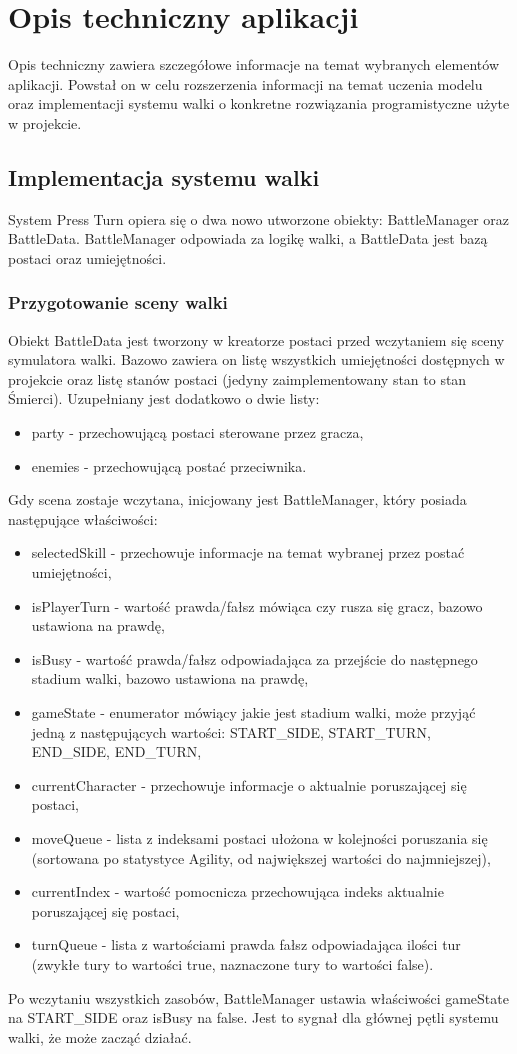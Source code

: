 \documentclass{SGGW-thesis}
\begin{document}
\chapter{Opis techniczny aplikacji}
Opis techniczny zawiera szczegółowe informacje na temat wybranych elementów aplikacji. Powstał on w celu rozszerzenia informacji na temat uczenia modelu oraz implementacji systemu walki o konkretne rozwiązania programistyczne użyte w projekcie.
\section{Implementacja systemu walki}
System Press Turn opiera się o dwa nowo utworzone obiekty: BattleManager oraz BattleData. BattleManager odpowiada za logikę walki, a BattleData jest bazą postaci oraz umiejętności.
\subsection{Przygotowanie sceny walki}
Obiekt BattleData jest tworzony w kreatorze postaci przed wczytaniem się sceny symulatora walki. Bazowo zawiera on listę wszystkich umiejętności dostępnych w projekcie oraz listę stanów postaci (jedyny zaimplementowany stan to stan Śmierci). 
Uzupełniany jest dodatkowo o dwie listy:
\begin{itemize}
  \item party - przechowującą postaci sterowane przez gracza,
  \item enemies - przechowującą postać przeciwnika.
\end{itemize}
Gdy scena zostaje wczytana, inicjowany jest BattleManager, który posiada następujące właściwości:
\begin{itemize}
  \item{selectedSkill - przechowuje informacje na temat wybranej przez postać umiejętności},
  \item{isPlayerTurn - wartość prawda/fałsz mówiąca czy rusza się gracz, bazowo ustawiona na prawdę},
  \item{isBusy - wartość prawda/fałsz odpowiadająca za przejście do następnego stadium walki, bazowo ustawiona na prawdę},
  \item{gameState - enumerator mówiący jakie jest stadium walki, może przyjąć jedną z następujących wartości: START\_SIDE, START\_TURN, END\_SIDE, END\_TURN},
  \item{currentCharacter - przechowuje informacje o aktualnie poruszającej się postaci},
  \item{moveQueue - lista z indeksami postaci ułożona w kolejności poruszania się (sortowana po statystyce Agility, od największej wartości do najmniejszej)},
  \item{currentIndex - wartość pomocnicza przechowująca indeks aktualnie poruszającej się postaci},
  \item{turnQueue - lista z wartościami prawda fałsz odpowiadająca ilości tur (zwykłe tury to wartości true, naznaczone tury to wartości false)}.
\end{itemize}
Po wczytaniu wszystkich zasobów, BattleManager ustawia właściwości gameState na START\_SIDE oraz isBusy na false.
Jest to sygnał dla głównej pętli systemu walki, że może zacząć działać.
\end{document}
